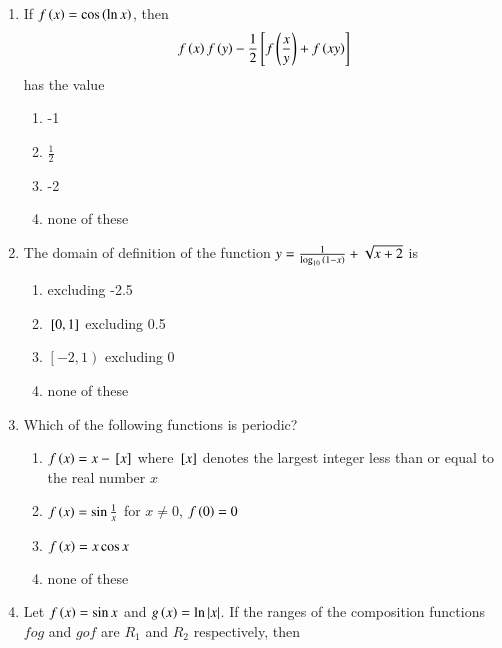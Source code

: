 \documentclass[journal]{IEEEtran}
\begin{document}
\begin{enumerate}

\item If $f\left(x\right) = \cos{\ensuremath{\left(\ln{x}\right)}}$, then $$f\left(x\right)f\left(y\right)-\frac{1}{2} {}\left[f\left(\frac{x}{y}\right)+f\left(xy\right)\right]$$ has the value

\hfill{}

\begin{multicols}{2}
	\begin{enumerate}
		\item -1 
		\item $\frac{1}{2}$
		\item -2 
		\item none of these
	\end{enumerate}
\end{multicols}

\item The domain of definition of the function
$y = \frac{1}{\log_{10}{\left(1-x\right)}} + \sqrt{x+2}$ is

\hfill{}

\begin{multicols}{2}
	\begin{enumerate}
		\item {} excluding -2.5 
		\item ${}\left[0, 1\right]$ excluding 0.5
		\item $\left[-2, 1\right)$ excluding 0 
		\item none of these
	\end{enumerate}
\end{multicols}

\item Which of the following functions is periodic?

\hfill{}

\begin{enumerate}
\item $f\left(x\right)=x-{}\left[x\right]$ where ${}\left[x\right]$ denotes the largest integer less than or equal to the real number $x$
\item $f\left(x\right)=\sin{\frac{1}{x}}$ for $x\neq0$, $f\left(0\right)=0$
\item $f\left(x\right)=x\cos{x}$
\item none of these
\end{enumerate}

\item Let $f\left(x\right)=\sin{x}$ and $g\left(x\right)=\ln{|x|}$. If the ranges of the composition functions $fog$ and $gof$ are $R_1$ and $R_2$ respectively, then 


\end{enumerate}
\end{document}
